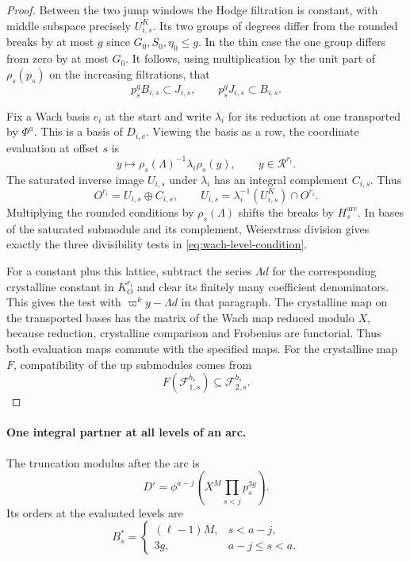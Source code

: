 \begin{proof}
Between the two jump windows the Hodge filtration is constant,
with middle subspace precisely \(U^K_{i,s}\). Its two groups
of degrees differ from the rounded breaks by at most \(g\)
since \(G_0,S_0,\eta_0\le g\). In the thin case the one
group differs from zero by at most \(G_0\). It follows,
using multiplication by the unit part of \(\rho_s(p_s)\) on
the increasing filtrations, that
\[
       p_s^g B_{i,s}\subset J_{i,s},\qquad
       p_s^g J_{i,s}\subset B_{i,s}.
\]

Fix a Wach basis \(e_i\) at the start and write \(\lambda_i\)
for its reduction at one transported by \(\Phi^a\). This is
a basis of \(D_{i,c}\). Viewing the basis as a row, the coordinate evaluation at offset \(s\) is
\[
 y\longmapsto\rho_s(\Lambda)^{-1}\lambda_i\rho_s(y),\qquad y\in\mathcal R^{r_i}.
\]
The saturated inverse image \(U_{i,s}\) under \(\lambda_i\) has an integral complement \(C_{i,s}\). Thus
\[
 O^{r_i}=U_{i,s}\oplus C_{i,s},\qquad U_{i,s}=\lambda_i^{-1}(U^K_{i,s})\cap O^{r_i}.
\]
Multiplying
the rounded conditions by \(\rho_s(\Lambda)\) shifts the breaks
by \(H_s^{\mathrm{arc}}\). In bases of the saturated submodule
and its complement, Weierstrass division gives exactly the
three divisibility tests in \eqref{eq:wach-level-condition}.

For a constant plus this lattice, subtract the series
\(\Lambda d\) for the corresponding crystalline constant
in \(K_O^{r_i}\) and clear its finitely many coefficient
denominators. This gives the test with \(\varpi^k y-\Lambda d\)
in that paragraph. The crystalline map on the transported
bases has the matrix of the Wach map reduced modulo \(X\), because
reduction, crystalline comparison and Frobenius are functorial.
Thus both evaluation maps commute with the specified maps.
For the crystalline map \(F\), compatibility of the up submodules comes from
\[
 F(\mathcal F_{1,s}^{b_s})\subseteq\mathcal F_{2,s}^{b_s}.
\]

\end{proof}

\paragraph{One integral partner at all levels of an arc.}\label{par:wach-partners}
The truncation modulus after the arc is
\[
 D'=\phi^{a-j}\left(X^M\prod_{s<j}p_s^{3g}\right).
\]
Its orders at the evaluated levels are
\[
 B_s^*=\begin{cases}
 (\ell-1)M,&s<a-j,\\
 3g,&a-j\le s<a .
 \end{cases}
\]

